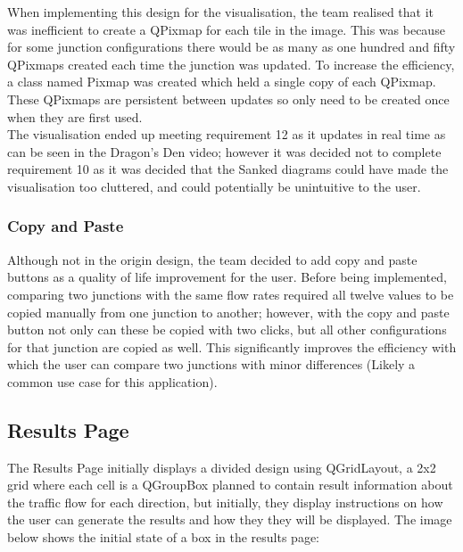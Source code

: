 \documentclass{article}
\begin{document}
            When implementing this design for the visualisation, the team realised that it was inefficient to create a QPixmap for each tile in the image. This 
            was because for some junction configurations there would be as many as one hundred and fifty QPixmaps created each time the junction was updated. To 
            increase the efficiency, a class named Pixmap was created which held a single copy of each QPixmap. These QPixmaps are persistent between updates so 
            only need to be created once when they are first used.\\

            The visualisation ended up meeting requirement 12 as it updates in real time as can be seen in the Dragon's Den video; however it was decided not to 
            complete requirement 10 as it was decided that the Sanked diagrams could have made the visualisation too cluttered, and could potentially be 
            unintuitive to the user.
        
        \subsubsection{Copy and Paste}
            Although not in the origin design, the team decided to add copy and paste buttons as a quality of life improvement for the user.
            Before being implemented, comparing two junctions with the same flow rates required all twelve values to be copied manually from one junction to another; 
            however, with the copy and paste button not only can these be copied with two clicks, but all other configurations for that junction are copied as well. 
            This significantly improves the efficiency with which the user can compare two junctions with minor differences (Likely a common use case for this application).



    \subsection{Results Page}

    The Results Page initially displays a divided design using QGridLayout, a 2x2 grid where each cell is a QGroupBox planned to contain result information about the traffic flow for each direction, but initially,
    they display instructions on how the user can generate the results and how they they will be displayed. The image below shows the initial state of a box in the results page:
\end{document}
